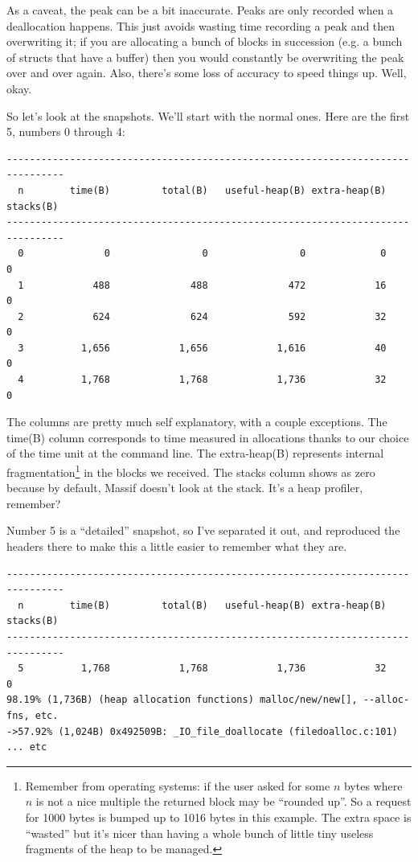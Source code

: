 \documentclass[a4paper]{report}
\begin{document}
As a caveat, the peak can be a bit inaccurate. Peaks are only recorded when a deallocation happens. This just avoids wasting time recording a peak and then overwriting it; if you are allocating a bunch of blocks in succession (e.g. a bunch of structs that have a buffer) then you would constantly be overwriting the peak over and over again. Also, there's some loss of accuracy to speed things up. Well, okay.

So let's look at the snapshots. We'll start with the normal ones. Here are the first 5, numbers 0 through 4:

{\scriptsize
\begin{verbatim}
--------------------------------------------------------------------------------
  n        time(B)         total(B)   useful-heap(B) extra-heap(B)    stacks(B)
--------------------------------------------------------------------------------
  0              0                0                0             0            0
  1            488              488              472            16            0
  2            624              624              592            32            0
  3          1,656            1,656            1,616            40            0
  4          1,768            1,768            1,736            32            0
\end{verbatim}
}

The columns are pretty much self explanatory, with a couple exceptions. The time(B) column corresponds to time measured in allocations thanks to our choice of the time unit at the command line. The extra-heap(B) represents internal fragmentation\footnote{Remember from operating systems: if the user asked for some $n$ bytes where $n$ is not a nice multiple the returned block may be ``rounded up''. So a request for 1000 bytes is bumped up to 1016 bytes in this example. The extra space is ``wasted'' but it's nicer than having a whole bunch of little tiny useless fragments of the heap to be managed.} in the blocks we received. The stacks column shows as zero because by default, Massif doesn't look at the stack. It's a heap profiler, remember?

Number 5 is a ``detailed'' snapshot, so I've separated it out, and reproduced the headers there to make this a little easier to remember what they are.

{
\begin{verbatim}
--------------------------------------------------------------------------------
  n        time(B)         total(B)   useful-heap(B) extra-heap(B)    stacks(B)
--------------------------------------------------------------------------------
  5          1,768            1,768            1,736            32            0
98.19% (1,736B) (heap allocation functions) malloc/new/new[], --alloc-fns, etc.
->57.92% (1,024B) 0x492509B: _IO_file_doallocate (filedoalloc.c:101)
... etc
\end{verbatim}
}
\end{document}
